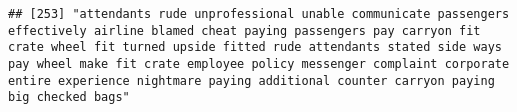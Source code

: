 \documentclass[
]{article}
\begin{document}
\begin{verbatim}
## [253] "attendants rude unprofessional unable communicate passengers effectively airline blamed cheat paying passengers pay carryon fit crate wheel fit turned upside fitted rude attendants stated side ways pay wheel make fit crate employee policy messenger complaint corporate entire experience nightmare paying additional counter carryon paying big checked bags"                                                                                                                                                                                                                                                                                                                                                                                                                                                                                                                                                                                                                                                                                                                                                                                                                                                                                                                                                                                                                                                                                                                                                                                                                                                                                                                                                                                                                            

\end{verbatim}
\end{document}
